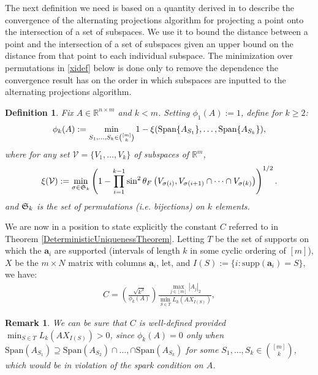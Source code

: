 \documentclass[journal, twocolumn]{IEEEtran}
\newtheorem{definition}{Definition}
\newtheorem{remark}{Remark}
\begin{document}
The next definition we need is based on a quantity derived in \cite{Deutsch12} to describe the convergence of the alternating projections algorithm for projecting a point onto the intersection of a set of subspaces. We use it to bound the distance between a point and the intersection of a set of subspaces given an upper bound on the distance from that point to each individual subspace. The minimization over permutations in \eqref{xidef} below is done only to remove the dependence the convergence result has on the order in which subspaces are inputted to the alternating projections algorithm.

\begin{definition}\label{SpecialSupportSet}
Fix $A \in \mathbb{R}^{n \times m}$ and $k < m$. Setting $\phi_1(A) := 1$, define for $k \geq 2$:
\begin{align}\label{rho}
\phi_k(A) := \min_{ S_1,\ldots,S_k \in {[m] \choose k} } 1 - \xi( \text{\rm Span}\{A_{S_1}\}, \ldots,  \text{\rm Span}\{A_{S_k}\}),
\end{align}
where for any set $\mathcal{V} = \{V_1, \ldots, V_k\}$ of subspaces of $\mathbb{R}^m$, 
\begin{align}\label{xidef}
\xi(\mathcal{V}) := \min_{\sigma \in \frak{S}_k} \left(1 - \prod_{i=1}^{k-1} \sin^2  \theta_F \left(V_{\sigma(i)}, V_{\sigma(i+1)} \cap \cdots \cap V_{\sigma(k)}\right)  \right)^{1/2}.
\end{align}
%
and $\frak{S}_{k}$ is the set of permutations (i.e. bijections) on $k$ elements. 
\end{definition}



We are now in a position to state explicitly the constant $C$ referred to in Theorem \ref{DeterministicUniquenessTheorem}. Letting $T$ be the set of supports on which the $\mathbf{a}_i$ are supported (intervals of length $k$ in some cyclic ordering of $[m]$), $X$ be the $m \times N$ matrix with columns $\mathbf{a}_i$, let, and $I(S) := \{i : \text{supp}(\mathbf{a}_i) = S\}$, we have:
\begin{align}\label{Cdef}
C = \left( \frac{ \sqrt{k^3}}{ \phi_k(A) } \right) \frac{\max_{j \in [m]} |A_j|_2}{\min_{S \in T} L_k(AX_{I(S)})}, 
\end{align}

\begin{remark}\label{nonzero}
We can be sure that $C$ is well-defined provided $\min_{S \in T} L_k(AX_{I(S)}) > 0$, since $\phi_k(A) = 0$ only when $\text{Span}(A_{S_1}) \supseteq \text{Span}(A_{S_2}) \cap \ldots, \cap \text{Span}(A_{S_k})$ for some $S_1, \ldots, S_k \in {[m] \choose k}$, which would be in violation of the spark condition on $A$.
\end{remark}
\end{document}
